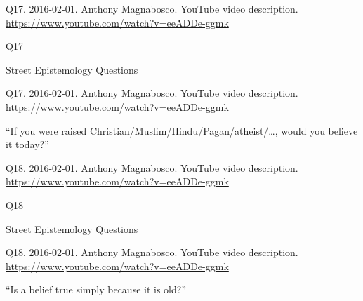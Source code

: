 \documentclass[
    src/templates/5x2-on-a4paper,
    frame
]{flashcards}
\newcommand{\myheader}{}
\newcommand{\myfooter}{
    \begin{flushright}
        \small\sc
        Street Epistemology Questions \par
    \end{flushright}
}
\begin{document}
        \renewcommand{\myheader}{
            \normalfont %
            \begin{tiny}
                Q17.
                2016-02-01.
                Anthony Magnabosco.
                    YouTube video description.
                    \\
                    \url{ https://www.youtube.com/watch?v=eeADDe-ggmk }
                \par
            \end{tiny}
        }
        \begin{flashcard}{
            \myheader
            \vspace{\fill}
            \begin{center}
                \large
                    Q17
            \end{center}
            \vspace{\fill}
            \myfooter
            \vspace{-1.4ex}
        }
            \myheader
            \vspace{\fill}
            \begin{center}
                \large
\enquote{If you were raised Christian\slash Muslim\slash Hindu\slash Pagan\slash atheist\slash \dots, would you believe it today?}            \end{center}
            \vspace{\fill}
        \end{flashcard}
        \renewcommand{\myheader}{
            \normalfont %
            \begin{tiny}
                Q18.
                2016-02-01.
                Anthony Magnabosco.
                    YouTube video description.
                    \\
                    \url{ https://www.youtube.com/watch?v=eeADDe-ggmk }
                \par
            \end{tiny}
        }
        \begin{flashcard}{
            \myheader
            \vspace{\fill}
            \begin{center}
                \large
                    Q18
            \end{center}
            \vspace{\fill}
            \myfooter
            \vspace{-1.4ex}
        }
            \myheader
            \vspace{\fill}
            \begin{center}
                \large
\enquote{Is a belief true simply because it is old?}            \end{center}
            \vspace{\fill}
        \end{flashcard}
\end{document}
